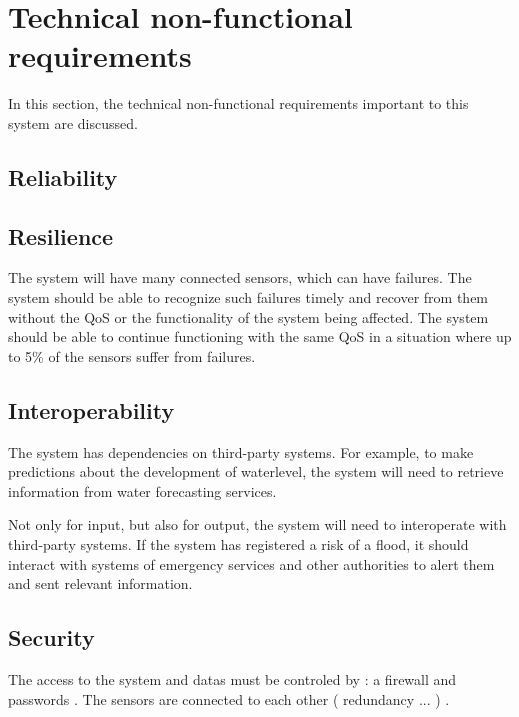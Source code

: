 \section{Technical non-functional requirements}
In this section, the technical non-functional requirements important to this system are discussed.

\subsection{Reliability}

\subsection{Resilience}
The system will have many connected sensors, which can have failures. 
The system should be able to recognize such failures timely and recover from them without the QoS or the functionality of the system being affected. 
The system should be able to continue functioning with the same QoS in a situation where up to 5\% of the sensors suffer from failures.  %

\subsection{Interoperability}
The system has dependencies on third-party systems. For example, to make predictions about the development of waterlevel, the system will need to retrieve information from water forecasting services. 

Not only for input, but also for output, the system will need to interoperate with third-party systems. If the system has registered a risk of a flood, it should interact with systems of emergency services and other authorities to alert them and sent relevant information.

\subsection{Security}
The access to the system and datas must be controled by : a firewall and passwords .
The sensors are connected to each other ( redundancy ... ) .

